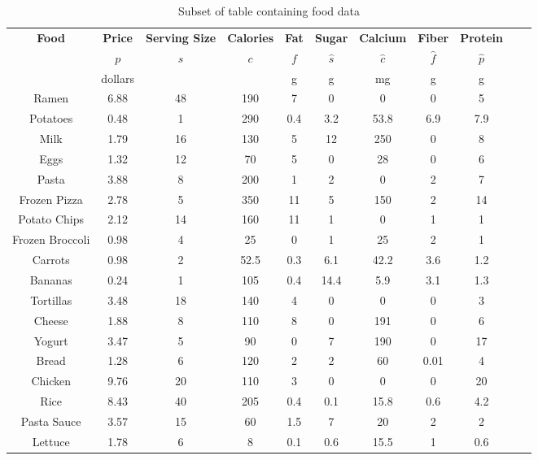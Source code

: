  \begin{table}[H]
\begin{tabular}{|c||c|c|c|c|c|c|c|c|c|c|}
\hline
\textbf{Food} & \textbf{Price} & \textbf{Serving Size} & \textbf{Calories} & \textbf{Fat} & \textbf{Sugar} & \textbf{Calcium} & \textbf{Fiber} & \textbf{Protein} \\ 
& $p$ & $s$ & $c$ & $f$ & $\hat{s}$ & $\hat{c}$ & $\hat{f}$ & $\hat{p}$ \\ 
& dollars & & & g & g & mg & g & g \\ \hline\hline
Ramen & 6.88 & 48 & 190 & 7 & 0 & 0 & 0 & 5 \\ \hline
Potatoes & 0.48 & 1 & 290 & 0.4 & 3.2 & 53.8 & 6.9 & 7.9 \\ \hline
Milk & 1.79 & 16 & 130 & 5 & 12 & 250 & 0 & 8 \\ \hline
Eggs & 1.32 & 12 & 70 & 5 & 0 & 28 & 0 & 6 \\ \hline
Pasta & 3.88 & 8 & 200 & 1 & 2 & 0 & 2 & 7 \\ \hline
Frozen Pizza & 2.78 & 5 & 350 & 11 & 5 & 150 & 2 & 14 \\ \hline
Potato Chips & 2.12 & 14 & 160 & 11 & 1 & 0 & 1 & 1 \\ \hline
Frozen Broccoli & 0.98 & 4 & 25 & 0 & 1 & 25 & 2 & 1 \\ \hline
Carrots & 0.98 & 2 & 52.5 & 0.3 & 6.1 & 42.2 & 3.6 & 1.2 \\ \hline
Bananas & 0.24 & 1 & 105 & 0.4 & 14.4 & 5.9 & 3.1 & 1.3 \\ \hline
Tortillas & 3.48 & 18 & 140 & 4 & 0 & 0 & 0 & 3 \\ \hline
Cheese & 1.88 & 8 & 110 & 8 & 0 & 191 & 0 & 6 \\ \hline
Yogurt & 3.47 & 5 & 90 & 0 & 7 & 190 & 0 & 17 \\ \hline
Bread & 1.28 & 6 & 120 & 2 & 2 & 60 & 0.01 & 4 \\ \hline
Chicken & 9.76 & 20 & 110 & 3 & 0 & 0 & 0 & 20 \\ \hline
Rice & 8.43 & 40 & 205 & 0.4 & 0.1 & 15.8 & 0.6 & 4.2 \\ \hline
Pasta Sauce & 3.57 & 15 & 60 & 1.5 & 7 & 20 & 2 & 2 \\ \hline
Lettuce & 1.78 & 6 & 8 & 0.1 & 0.6 & 15.5 & 1 & 0.6 \\ \hline
\end{tabular}
\caption{Subset of table containing food data}
\label{tab:food-data}
\end{table}



